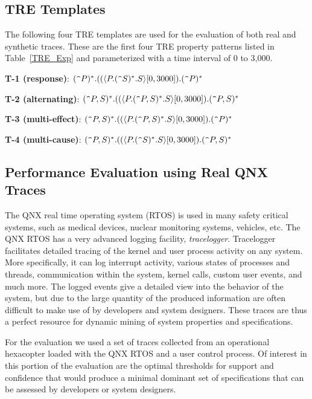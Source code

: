 \documentclass[]{sigplanconf}
\begin{document}
\subsection{TRE Templates}
The following four TRE templates are used for the evaluation of both real and synthetic traces. These are the first four TRE property patterns listed in Table~\ref{TRE_Exp} and parameterized with a time interval of 0 to 3,000.
\vspace{2mm}

\noindent \textbf{T-1 (response)}: $(\verb!^!P)^*.((\langle P.(\verb!^!S)^*.S\rangle[0, 3000]).(\verb!^!P)^*$

\noindent \textbf{T-2 (alternating)}: $(\verb!^!P,S)^*.((\langle P.(\verb!^!P,S)^*.S\rangle[0, 3000]).(\verb!^!P,S)^*$

\noindent \textbf{T-3 (multi-effect)}: $(\verb!^!P,S)^*.((\langle P.(\verb!^!P,S)^*.S\rangle[0, 3000]).(\verb!^!P)^*$

\noindent \textbf{T-4 (multi-cause)}: $(\verb!^!P,S)^*.((\langle P.(\verb!^!S)^*.S\rangle[0, 3000]).(\verb!^!P,S)^*$


\subsection{Performance Evaluation using Real QNX Traces}

The QNX real time operating system (RTOS) is used in many safety critical systems, such as medical devices, nuclear monitoring systems, vehicles, etc. The QNX RTOS has a very advanced logging facility, \emph{tracelogger}. Tracelogger facilitates detailed tracing of the kernel and user process activity on any system. More specifically, it can log interrupt activity, various states of processes and threads, communication within the system, kernel calls, custom user events, and much more. The logged events give a detailed view into the behavior of the system, but due to the large quantity of the produced information are often difficult to make use of by developers and system designers. These traces are thus a perfect resource for dynamic mining of system properties and specifications.

For the evaluation we used a set of traces collected from an operational hexacopter loaded with the QNX RTOS and a user control process. Of interest in this portion of the evaluation are the optimal thresholds for support and confidence that would produce a minimal dominant set of specifications that can be assessed by developers or system designers.
\end{document}
